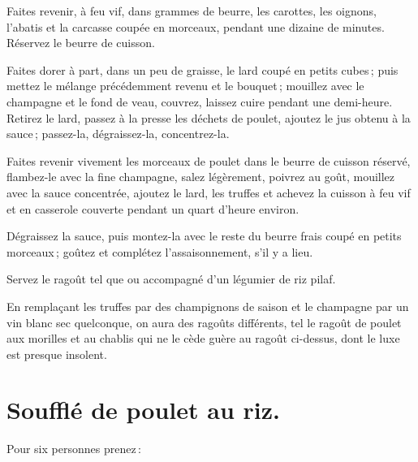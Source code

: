Faites revenir, à feu vif, dans {\mmm} grammes de beurre, les carottes, les
oignons, l'abatis et la carcasse coupée en morceaux, pendant une dizaine de
minutes. Réservez le beurre de cuisson.

Faites dorer à part, dans un peu de graisse, le lard coupé en petits cubes ;
puis mettez le mélange précédemment revenu et le bouquet ; mouillez avec le
champagne et le fond de veau, couvrez, laissez cuire pendant une demi-heure.
Retirez le lard, passez à la presse les déchets de poulet, ajoutez le jus
obtenu à la sauce ; passez-la, dégraissez-la, concentrez-la.

Faites revenir vivement les morceaux de poulet dans le beurre de cuisson
réservé, flambez-le avec la fine champagne, salez légèrement, poivrez au goût,
mouillez avec la sauce concentrée, ajoutez le lard, les truffes et achevez la
cuisson à feu vif et en casserole couverte pendant un quart d'heure environ.

Dégraissez la sauce, puis montez-la avec le reste du beurre frais coupé en
petits morceaux ; goûtez et complétez l'assaisonnement, s'il y a lieu.

Servez le ragoût tel que ou accompagné d'un légumier de riz pilaf.

\sk

En remplaçant les truffes par des champignons de saison et le champagne par un
vin blanc sec quelconque, on aura des ragoûts différents, tel le ragoût de poulet
aux morilles et au chablis qui ne le cède guère au ragoût ci-dessus, dont le luxe
est presque insolent.

\section*{\centering Soufflé de poulet au riz.}
{}

Pour six personnes prenez :

\medskip


